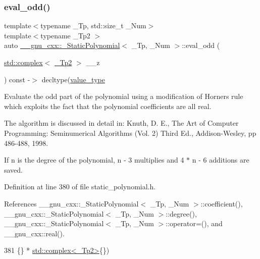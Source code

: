 \subsubsection{\texorpdfstring{eval\+\_\+odd()}{eval\_odd()}\hspace{0.1cm}{\footnotesize\ttfamily [2/2]}}
{\footnotesize\ttfamily template$<$typename \+\_\+\+Tp, std\+::size\+\_\+t \+\_\+\+Num$>$ \\
template$<$typename \+\_\+\+Tp2 $>$ \\
auto \hyperlink{class____gnu__cxx_1_1__StaticPolynomial}{\+\_\+\+\_\+gnu\+\_\+cxx\+::\+\_\+\+Static\+Polynomial}$<$ \+\_\+\+Tp, \+\_\+\+Num $>$\+::eval\+\_\+odd (\begin{DoxyParamCaption}\item[{\hyperlink{classstd_1_1complex}{std\+::complex}$<$ \hyperlink{class____gnu__cxx_1_1__StaticPolynomial_a111ee5aedd5ae8c0b4d8fa8f29d1f9b9}{\+\_\+\+Tp2} $>$}]{\+\_\+\+\_\+z }\end{DoxyParamCaption}) const -\/$>$ decltype(\hyperlink{class____gnu__cxx_1_1__StaticPolynomial_af23110f5a002cd6caa3542df7cf35284}{value\+\_\+type}\hspace{0.3cm}{\ttfamily [inline]}}

Evaluate the odd part of the polynomial using a modification of Horner\textquotesingle{}s rule which exploits the fact that the polynomial coefficients are all real.

The algorithm is discussed in detail in\+: Knuth, D. E., The Art of Computer Programming\+: Seminumerical Algorithms (Vol. 2) Third Ed., Addison-\/\+Wesley, pp 486-\/488, 1998.

If n is the degree of the polynomial, n -\/ 3 multiplies and 4 $\ast$ n -\/ 6 additions are saved. 

Definition at line 380 of file static\+\_\+polynomial.\+h.



References \+\_\+\+\_\+gnu\+\_\+cxx\+::\+\_\+\+Static\+Polynomial$<$ \+\_\+\+Tp, \+\_\+\+Num $>$\+::coefficient(), \+\_\+\+\_\+gnu\+\_\+cxx\+::\+\_\+\+Static\+Polynomial$<$ \+\_\+\+Tp, \+\_\+\+Num $>$\+::degree(), \+\_\+\+\_\+gnu\+\_\+cxx\+::\+\_\+\+Static\+Polynomial$<$ \+\_\+\+Tp, \+\_\+\+Num $>$\+::operator=(), and \+\_\+\+\_\+gnu\+\_\+cxx\+::real().


\begin{DoxyCode}
381                               \{\} * \hyperlink{classstd_1_1complex}{std::complex<\_Tp2>}\{\})
\end{DoxyCode}
\mbox{\label{class____gnu__cxx_1_1__StaticPolynomial_a93fc2113c7886a70c56ef43161e83421}} 
